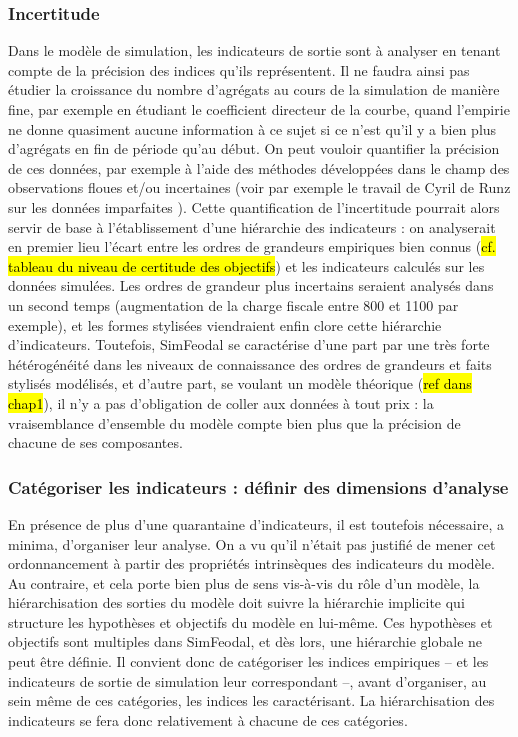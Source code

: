 \subsubsection{Incertitude}\label{sssec:incertitude}
Dans le modèle de simulation, les indicateurs de sortie sont à analyser en tenant compte de la précision des indices qu'ils représentent.
Il ne faudra ainsi pas étudier la croissance du nombre d'agrégats au cours de la simulation de manière fine, par exemple en étudiant le coefficient directeur de la courbe, quand l'empirie ne donne quasiment aucune information à ce sujet si ce n'est qu'il y a bien plus d'agrégats en fin de période qu'au début.
On peut vouloir quantifier la précision de ces données, par exemple à l'aide des méthodes développées dans le champ des observations floues et/ou incertaines (voir par exemple le travail de Cyril de Runz sur les données \og imparfaites\fg{} \autocite{de2008imperfection}).
Cette quantification de l'incertitude pourrait alors servir de base à l'établissement d'une hiérarchie des indicateurs :
on analyserait en premier lieu l'écart entre les ordres de grandeurs empiriques bien connus (\hl{cf. tableau du niveau de certitude des objectifs}) et les indicateurs calculés sur les données simulées.
Les ordres de grandeur plus incertains seraient analysés dans un second temps (augmentation de la charge fiscale entre 800 et 1100 par exemple), et les formes stylisées viendraient enfin clore cette hiérarchie d'indicateurs.
Toutefois, SimFeodal se caractérise d'une part par une très forte hétérogénéité dans les niveaux de connaissance des ordres de grandeurs et faits stylisés modélisés, et d'autre part, se voulant un modèle théorique (\hl{ref dans chap1}), il n'y a pas d'obligation de \og coller aux données\fg{} à tout prix :
la vraisemblance d'ensemble du modèle compte bien plus que la précision de chacune de ses composantes.


\subsubsection{Catégoriser les indicateurs : définir des dimensions d'analyse}
En présence de plus d'une quarantaine d'indicateurs, il est toutefois nécessaire, a minima, d'organiser leur analyse.
On a vu qu'il n'était pas justifié de mener cet ordonnancement à partir des propriétés intrinsèques des indicateurs du modèle.
Au contraire, et cela porte bien plus de sens vis-à-vis du rôle d'un modèle, la hiérarchisation des sorties du modèle doit suivre la hiérarchie implicite qui structure les hypothèses et objectifs du modèle en lui-même.
Ces hypothèses et objectifs sont multiples dans SimFeodal, et dès lors, une hiérarchie globale ne peut être définie.
Il convient donc de catégoriser les indices empiriques -- et les indicateurs de sortie de simulation leur correspondant --, avant d'organiser, au sein même de ces catégories, les indices les caractérisant.
La hiérarchisation des indicateurs se fera donc relativement à chacune de ces catégories.

